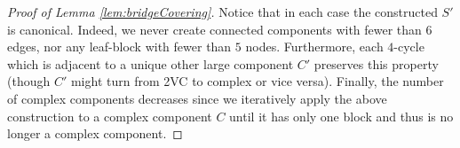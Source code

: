 \documentclass{theoretics}
\newcounter{casei}
\newenvironment{caseanalysis}{\setcounter{casei}{0}}{}
\begin{document}
\begin{proof}[Proof of Lemma \ref{lem:bridgeCovering}]
\begin{caseanalysis}
\end{caseanalysis}

Notice that in each case the constructed $S'$ is canonical. Indeed, we never create connected components with fewer than $6$ edges, nor any leaf-block with fewer than $5$ nodes. Furthermore, each $4$-cycle which is adjacent to a unique other large component $C'$ preserves this property (though $C'$ might turn from 2VC to complex or vice versa). Finally, the number of complex components decreases since we iteratively apply the above construction to a complex component $C$ until it has only one block and thus is no longer a complex component.
\end{proof}

\printbibliography
\end{document}
